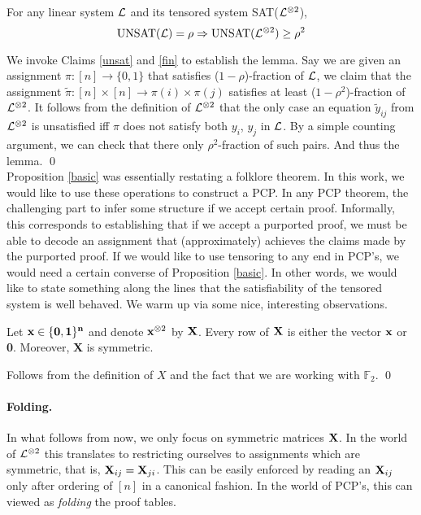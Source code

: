 {\begin{proposition}\label{basic}
For any linear system ${\cal L}$ and its tensored system SAT(${\cal L}^{\otimes 2}$),
\[
    \mbox{UNSAT}({\cal L}) = \rho \Rightarrow \mbox{UNSAT}({\cal L}^{\otimes 2})   \ge \rho^2  
\]
\end{proposition}
 We invoke Claims \ref{unsat} and \ref{fin}
to establish the lemma. Say we are given an assignment $\pi : [n]
\rightarrow \{0,1\}$ that satisfies ($1 - \rho$)-fraction of ${\cal L}$, we
claim that the assignment $\tilde{\pi} : [n] \times [n] \rightarrow
\pi(i) \times \pi(j)$ satisfies at least ($1 - \rho^2$)-fraction of
${\cal L}^{\otimes 2}$. It follows from the definition of ${\cal L}^{\otimes 2}$
that the only case an equation $\tilde{y}_{ij}$ from ${\cal L}^{\otimes
  2}$ is unsatisfied iff $\pi$ does not satisfy both $y_i$, $y_j$ in
${\cal L}$. By a simple counting argument, we can check that there only
$\rho^2$-fraction of such pairs. And thus the lemma. \qed \\


\noindent Proposition \ref{basic} was essentially restating a folklore
theorem. In this work, we would like to use these operations to
construct a PCP. In any PCP theorem, the challenging part to infer
some structure if we accept certain proof. Informally, this
corresponds to establishing that if we accept a purported proof, we
must be able to decode an assignment that (approximately) achieves the
claims made by the purported proof. If we would like to use tensoring
to any end in PCP's, we would need a certain converse of Proposition
\ref{basic}. In other words, we would like to state something along
the lines that the satisfiability of the tensored system is well
behaved. We warm up via some nice, interesting observations.

\begin{claim}\label{uni}
  Let ${\bf x \in \{0,1\}^n}$ and denote ${\bf x}^{\otimes 2}$ by
  ${\bf X}$. Every row of ${\bf X}$ is either the vector ${\bf x}$ or
  {\bf 0}. Moreover, {\bf X} is symmetric.
\end{claim}
 Follows from the definition of $X$ and
the fact that we are working with $\mathbb{F}_2$.  \qed

 
\paragraph{Folding.} In what follows from now, we only focus on
symmetric matrices ${\bf X}$. In the world of ${\cal L}^{\otimes 2}$ this
translates to restricting ourselves to assignments which are
symmetric, that is, ${\bf X}_{ij} = {\bf X}_{ji}$. This can be easily
enforced by reading an ${\bf X}_{ij}$ only after ordering of $[n]$ in
a canonical fashion. In the world of PCP's, this can viewed as {\em
  folding} the proof tables.


}
